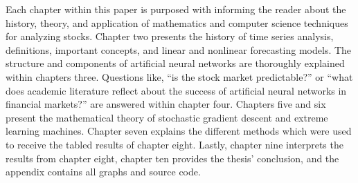 \documentclass[../main.tex]{subfiles}
\begin{document}
    Each chapter within this paper is purposed with informing the reader about the history, theory, and application of mathematics and computer science techniques for analyzing stocks.
    Chapter two presents the history of time series analysis, definitions, important concepts, and linear and nonlinear forecasting models.
    The structure and components of artificial neural networks are thoroughly explained within chapters three.
    Questions like, ``is the stock market predictable?'' or ``what does academic literature reflect about the success of artificial neural networks in financial markets?'' are answered within chapter four.
    Chapters five and six present the mathematical theory of stochastic gradient descent and extreme learning machines.
    Chapter seven explains the different methods which were used to receive the tabled results of chapter eight.
    Lastly, chapter nine interprets the results from chapter eight, chapter ten provides the thesis’ conclusion, and the appendix contains all graphs and source code.
\end{document}
